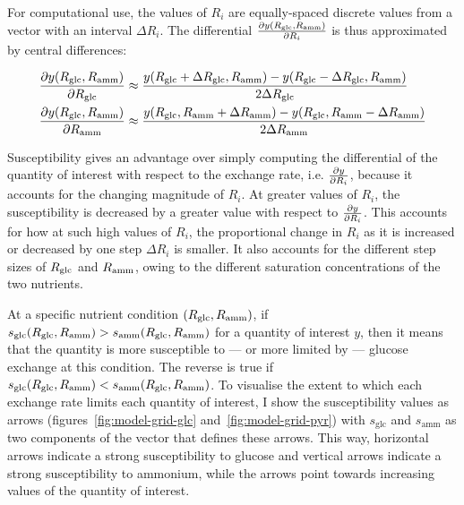For computational use, the values of $R_{i}$ are equally-spaced discrete values from a vector with an interval $\Delta R_{i}$.
The differential $\frac{\partial y(R_{\mathrm{glc}}, R_{\mathrm{amm}})}{\partial R_{i}}$ is thus approximated by central differences:

\begin{equation}
  \begin{aligned}
  \frac{\partial y(R_{\mathrm{glc}}, R_{\mathrm{amm}})}{\partial R_{\mathrm{glc}}} &\approx \frac{y(R_{\mathrm{glc}} + \Delta R_{\mathrm{glc}}, R_{\mathrm{amm}}) - y(R_{\mathrm{glc}} - \Delta R_{\mathrm{glc}}, R_{\mathrm{amm}})}{2\Delta R_{\mathrm{glc}}}\\
  \frac{\partial y(R_{\mathrm{glc}}, R_{\mathrm{amm}})}{\partial R_{\mathrm{amm}}} &\approx \frac{y(R_{\mathrm{glc}}, R_{\mathrm{amm}} + \Delta R_{\mathrm{amm}}) - y(R_{\mathrm{glc}}, R_{\mathrm{amm}} - \Delta R_{\mathrm{amm}})}{2\Delta R_{\mathrm{amm}}}
  \end{aligned}
  \label{eq:model-central-difference}
\end{equation}

Susceptibility gives an advantage over simply computing the differential of the quantity of interest with respect to the exchange rate, i.e. $\frac{\partial y}{\partial R_{i}}$, because it accounts for the changing magnitude of $R_{i}$.
At greater values of $R_{i}$, the susceptibility is decreased by a greater value with respect to $\frac{\partial y}{\partial R_{i}}$.
This accounts for how at such high values of $R_{i}$, the proportional change in $R_{i}$ as it is increased or decreased by one step $\Delta R_{i}$ is smaller.
It also accounts for the different step sizes of $R_{\mathrm{glc}}$ and $R_{\mathrm{amm}}$, owing to the different saturation concentrations of the two nutrients.

At a specific nutrient condition $(R_{\mathrm{glc}}, R_{\mathrm{amm}})$, if $s_{\mathrm{glc}}(R_{\mathrm{glc}}, R_{\mathrm{amm}}) > s_{\mathrm{amm}}(R_{\mathrm{glc}}, R_{\mathrm{amm}})$ for a quantity of interest $y$, then it means that the quantity is more susceptible to --- or more limited by --- glucose exchange at this condition.
The reverse is true if $s_{\mathrm{glc}}(R_{\mathrm{glc}}, R_{\mathrm{amm}}) < s_{\mathrm{amm}}(R_{\mathrm{glc}}, R_{\mathrm{amm}})$.
To visualise the extent to which each exchange rate limits each quantity of interest, I show the susceptibility values as arrows (figures~\ref{fig:model-grid-glc} and~\ref{fig:model-grid-pyr}) with $s_{\mathrm{glc}}$ and $s_{\mathrm{amm}}$ as two components of the vector that defines these arrows.
This way, horizontal arrows indicate a strong susceptibility to glucose and vertical arrows indicate a strong susceptibility to ammonium, while the arrows point towards increasing values of the quantity of interest.

